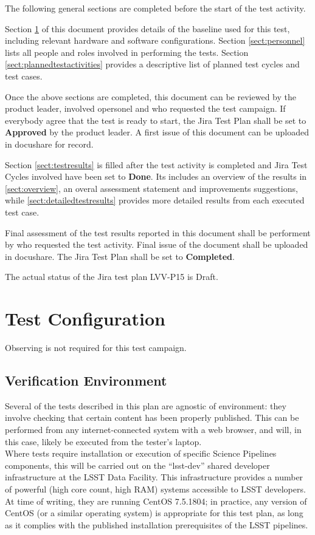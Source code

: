 \documentclass[DM,lsstdraft,STR,toc]{lsstdoc}
\begin{document}
The following general sections are completed before the start of the test activity.

Section \ref{sect:configuration} of this document provides details of the \product{} baseline used for this test, including relevant hardware and software configurations.
Section \ref{sect:personnel} lists all people and roles involved in performing the tests.
Section \ref{sect:plannedtestactivities} provides a descriptive list of planned test cycles and test cases.

Once the above sections are completed, this document can be reviewed by the product leader, involved opersonel and who requested the test campaign.
If everybody agree that the test is ready to start, the Jira Test Plan shall be set to {\bf Approved} by the \product{} product leader.
A first issue of this document can be uploaded in docushare for record.

Section \ref{sect:testresults} is filled after the test activity is completed and Jira Test Cycles involved have been set to {\bf Done}.
Its includes  an overview of the results in \ref{sect:overview}, an overal assessment statement and improvements suggestions,
while \ref{sect:detailedtestresults} provides more detailed results from each executed test case.

Final assessment of the test results reported in this document shall be performent by who requested the test activity.
Final issue of the document shall be uploaded in docushare.
The Jira Test Plan shall be set to {\bf Completed}.

The actual status of the Jira test plan LVV-P15 is Draft.

\section{Test Configuration}
\label{sect:configuration}

Observing is not required for this test campaign.

\subsection{Verification Environment}
\label{sect:hwconf}
Several of the tests described in this plan are agnostic of environment:
they involve checking that certain content has been properly published.
This can be performed from any internet-connected system with a web
browser, and will, in this case, likely be executed from the tester's
laptop.\\[2\baselineskip]Where tests require installation or execution
of specific Science Pipelines components, this will be carried out on
the ``lsst-dev'' shared developer infrastructure at the LSST Data
Facility. This infrastructure provides a number of powerful (high core
count, high RAM) systems accessible to LSST developers. At time of
writing, they are running CentOS 7.5.1804; in practice, any version of
CentOS (or a similar operating system) is appropriate for this test
plan, as long as it complies with the published installation
prerequisites of the LSST pipelines.\\[2\baselineskip]
\end{document}
